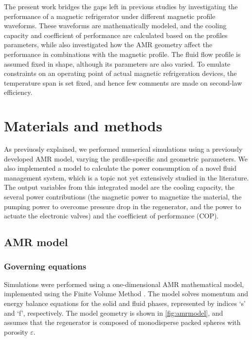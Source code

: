 \documentclass[referee]{svjour3}
\begin{document}
The present work bridges the gaps left in previous studies by investigating the performance of a magnetic refrigerator under different magnetic profile waveforms. These waveforms are mathematically modeled, and the cooling capacity and coefficient of performance are calculated based on the profiles parameters, while also investigated how the AMR geometry affect the performance in combinations with the magnetic profile. The fluid flow profile is assumed fixed in shape, although its parameters are also varied. To emulate constraints on an operating point of actual magnetic refrigeration devices, the temperature span is set fixed, and hence few comments are made on second-law efficiency.

\section{Materials and methods}
\label{sec:materials-methods}

As previuosly explained, we performed numerical simulations using a previously developed AMR model, varying the profile-specific and geometric parameters. We also implemented a model to calculate the power consumption of a novel fluid management system, which is a topic not yet extensively studied in the literature. The output variables from this integrated model are the cooling capacity, the several power contributions (the magnetic power to magnetize the material, the pumping power to overcome pressure drop in the regenerator, and the power to actuate the electronic valves) and the coefficient of performance (COP).


\subsection{AMR model}
\label{sec:amr-model}

\subsubsection{Governing equations}
\label{sec:governing-equations}

Simulations were performed using a one-dimensional AMR mathematical model, implemented using the Finite Volume Method \cite{bib:trevizoli16_perfor_model}. The model solves momentum and energy balance equations for the solid and fluid phases, represented by indices `s' and `f', respectively. The model geometry is shown in \autoref{fig:amrmodel}, and assumes that the regenerator is composed of monodisperse packed spheres with porosity $\varepsilon$.
\end{document}
